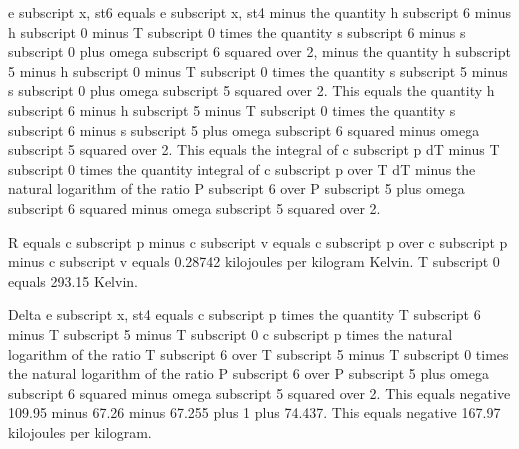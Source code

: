 e subscript x, st6 equals e subscript x, st4 minus the quantity h subscript 6 minus h subscript 0 minus T subscript 0 times the quantity s subscript 6 minus s subscript 0 plus omega subscript 6 squared over 2, minus the quantity h subscript 5 minus h subscript 0 minus T subscript 0 times the quantity s subscript 5 minus s subscript 0 plus omega subscript 5 squared over 2. This equals the quantity h subscript 6 minus h subscript 5 minus T subscript 0 times the quantity s subscript 6 minus s subscript 5 plus omega subscript 6 squared minus omega subscript 5 squared over 2. This equals the integral of c subscript p dT minus T subscript 0 times the quantity integral of c subscript p over T dT minus the natural logarithm of the ratio P subscript 6 over P subscript 5 plus omega subscript 6 squared minus omega subscript 5 squared over 2.

R equals c subscript p minus c subscript v equals c subscript p over c subscript p minus c subscript v equals 0.28742 kilojoules per kilogram Kelvin.
T subscript 0 equals 293.15 Kelvin.

Delta e subscript x, st4 equals c subscript p times the quantity T subscript 6 minus T subscript 5 minus T subscript 0 c subscript p times the natural logarithm of the ratio T subscript 6 over T subscript 5 minus T subscript 0 times the natural logarithm of the ratio P subscript 6 over P subscript 5 plus omega subscript 6 squared minus omega subscript 5 squared over 2. This equals negative 109.95 minus 67.26 minus 67.255 plus 1 plus 74.437. This equals negative 167.97 kilojoules per kilogram.